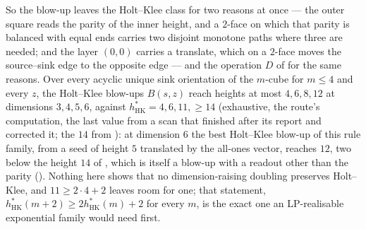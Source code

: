 \documentclass[11pt]{article}
\theoremstyle{plain}
\theoremstyle{definition}
\begin{document}
So the blow-up leaves the Holt--Klee class for two reasons at once ---
the outer square reads the parity of the inner height, and a $2$-face on
which that parity is balanced with equal ends carries two disjoint
monotone paths where three are needed; and the layer $(0,0)$ carries a
translate, which on a $2$-face moves the source--sink edge to the opposite
edge --- and the operation $D$ of  for the same
reasons. Over every acyclic unique sink orientation of the $m$-cube for
$m\le4$ and every $z$, the Holt--Klee blow-ups $B(s,z)$ reach heights at
most $4,6,8,12$ at dimensions $3,4,5,6$, against
$h^{\ast}_{\mathrm{HK}}=4,6,11,\ge14$ (exhaustive, the route's
computation, the last value from a scan that finished after its report
and corrected it; the $14$ from ): at dimension $6$
the best Holt--Klee blow-up of this rule family, from a seed of height $5$
translated by the all-ones vector, reaches $12$, two below the height
$14$ of , which is itself a blow-up with a readout
other than the parity (). Nothing here shows that no
dimension-raising doubling preserves Holt--Klee, and $11\ge2\cdot4+2$
leaves room for one;
that statement, $h^{\ast}_{\mathrm{HK}}(m+2)\ge2h^{\ast}_{\mathrm{HK}}(m)+2$
for every $m$, is the exact one an LP-realisable exponential family would
need first.
\end{document}
